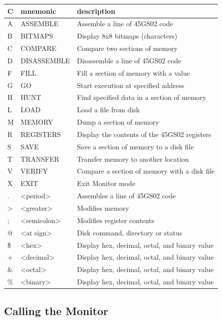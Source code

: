 {
\ttfamily
\setlength{\tabcolsep}{1mm}
\begin{tabular}{|l|l|l|}
\hline
C & mnemonic & description \\
\hline
A &     ASSEMBLE        & Assemble a line of 45GS02 code\\
B &     BITMAPS         & Display 8x8 bitmaps (characters)\\
C &     COMPARE         & Compare two sections of memory\\
D &     DISASSEMBLE     & Disassemble a line of 45GS02 code\\
F &     FILL            & Fill a section of memory with a value \\
G &     GO              & Start execution at specified address\\
H &     HUNT            & Find specified data in a section of memory\\
L &     LOAD            & Load a file from disk\\
M &     MEMORY          & Dump a section of memory\\
R &     REGISTERS       & Display the contents of the 45GS02 registers\\
S &     SAVE            & Save a section of memory to a disk file\\
T &     TRANSFER        & Transfer memory to another location\\
V &     VERIFY          & Compare a section of memory with a disk file\\
X &     EXIT            & Exit Monitor mode\\
\hline
 . &     <period>        & Assembles a line of 45GS02 code\\
 > &     <greater>       & Modifies memory\\
 ; &     <semicolon>     & Modifies register contents\\
 @ &     <at sign>       & Disk command, directory or status\\
\hline
\$ &     <hex>           & Display hex, decimal, octal, and binary value \\
 + &     <decimal>       & Display hex, decimal, octal, and binary value\\
\& &     <octal>         & Display hex, decimal, octal, and binary value\\
\% &     <binary>        & Display hex, decimal, octal, and binary value\\
\hline
\end{tabular}
}


\subsection {Calling the Monitor}

